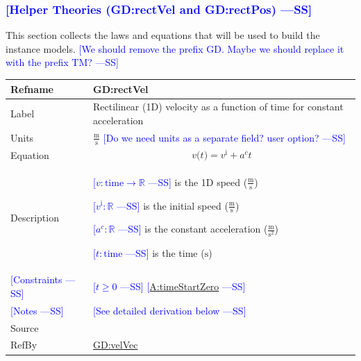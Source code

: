 \documentclass[12pt]{article}
\newcommand{\authornote}[3]{\textcolor{#1}{[#3 ---#2]}}
\newcommand{\authornote}[3]{}
\newcommand{\wss}[1]{\authornote{blue}{SS}{#1}}
\begin{document}
\subsubsection{\wss{Helper Theories (GD:rectVel and GD:rectPos)}}
\label{Sec:GDs}
This section collects the laws and equations that will be used to build the instance models.
\wss{We should remove the prefix GD.  Maybe we should replace it with the prefix
TM?}
\medskip
\noindent
\begin{minipage}{\textwidth}
\begin{tabular}{>{\raggedright}p{}>{\raggedright\arraybackslash}p{}}
\toprule \textbf{Refname} & \textbf{GD:rectVel}
\label{GD:rectVel}
\\ \midrule
Label & Rectilinear (1D) velocity as a function of time for constant acceleration
        
\\ \midrule
Units & $\frac{\text{m}}{\text{s}}$ \wss{Do we need units as a separate field? user option?}
\\ \midrule
Equation & \begin{displaymath}
           v\text{(}t\text{)}={v^{\text{i}}}+{a^{c}} t
           \end{displaymath}
\\ \midrule
Description & \begin{symbDescription}
              \item{\wss{$v: \text{time} \rightarrow \mathbb{R}$} is the 1D speed ($\frac{\text{m}}{\text{s}}$)}
              \item{\wss{${v^{\text{i}}: \mathbb{R}}$} is the initial speed ($\frac{\text{m}}{\text{s}}$)}
              \item{\wss{${a^{c}: \mathbb{R}}$} is the constant acceleration ($\frac{\text{m}}{\text{s}^{2}}$)}
              \item{\wss{$t: \text{time}$} is the time (${\text{s}}$)}
              \end{symbDescription}

\\ \midrule
\wss{Constraints} & \wss{$t \geq 0$} \wss{\hyperref[timeStartZero]{A:timeStartZero}}

\\ \midrule
\wss{Notes} & \wss{See detailed derivation below}

\\ \midrule
Source & \cite[(pg. 8)]{hibbeler2004}
         
\\ \midrule
RefBy & \hyperref[GD:velVec]{GD:velVec}%
        
\\ \bottomrule
\end{tabular}
\end{minipage}
\end{document}
